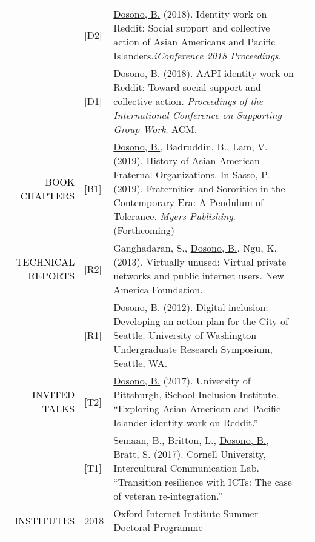\documentclass[12pt]{article}
\begin{document}
{{\begin{longtable}{Rp{1.0in}p{0.25in}p{4.75in}}
& \footnotesize{[D2]} & \href{http://ischools.org/the-iconference/program/doctoral-colloquium/2018-doctoral-colloquium/}{{Dosono, B.}} (2018). Identity work on Reddit: Social support and collective action of Asian Americans and Pacific Islanders.\textit{iConference 2018 Proceedings}. \\

& \footnotesize{[D1]} & \href{https://dl.acm.org/authorize?N42808}{{Dosono, B.}} (2018). AAPI identity work on Reddit: Toward social support and collective action. \textit{Proceedings of the International Conference on Supporting Group Work}. ACM. \\

\textcolor{black}{\footnotesize{\uppercase{Book Chapters}}} & \footnotesize{[B1]} & \href{http://myersedpress.com/BookDetail.aspx?productID=536594}{{Dosono, B.}}, Badruddin, B., Lam, V. (2019). History of Asian American Fraternal Organizations. In Sasso, P. (2019). Fraternities and Sororities in the Contemporary Era: A Pendulum of Tolerance. \textit{Myers Publishing}. (Forthcoming) \\

\textcolor{black}{\footnotesize{\uppercase{Technical Reports}}} & \footnotesize{[R2]} & Ganghadaran, S., \href{http://newamerica.net/publications/policy/virtually_unused}{{Dosono, B.}}, Ngu, K. (2013). Virtually unused: Virtual private networks and public internet users. New America Foundation. \\

& \footnotesize{[R1]} & \href{http://youtu.be/Xob0hWqZQgU}{{Dosono, B.}} (2012). Digital inclusion: Developing an action plan for the City of Seattle. University of Washington Undergraduate Research Symposium, Seattle, WA. \\

\textcolor{black}{\footnotesize{\uppercase{Invited Talks}}} & \footnotesize{[T2]} & \href{http://www.sis.pitt.edu/i3/i3-cohorts/2017/schedule.html}{{Dosono, B.}} (2017). University of Pittsburgh, iSchool Inclusion Institute. ``Exploring Asian American and Pacific Islander identity work on Reddit.'' \\

& \footnotesize{[T1]} & Semaan, B., Britton, L., \href{http://bit.ly/CornellTalk}{{Dosono, B.}}, Bratt, S. (2017). Cornell University, Intercultural Communication Lab. ``Transition resilience with ICTs: The case of veteran re-integration.'' \\

\textcolor{black}{\footnotesize{\uppercase{Institutes}}} & \footnotesize{2018} & \href{https://www.oii.ox.ac.uk/study/summer-doctoral-programme/}{{Oxford Internet Institute Summer Doctoral Programme}} \\


\end{longtable}}}
\end{document}
